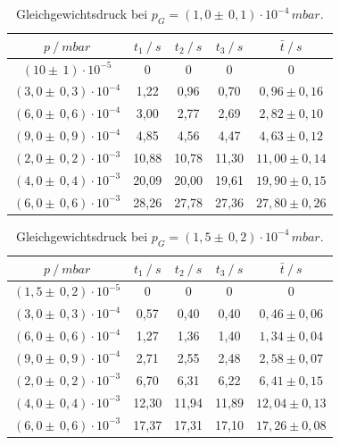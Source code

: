 \begin{table}[H]
\centering
\begin{tabular}{c|c|c|c|c}
	{$p \:/\: \si{mbar}$} & {$t_1 \:/\: \si{s} $} & {$t_2 \:/\: \si{s} $} & {$t_3 \:/\: \si{s} $} & {$\bar{t} \:/\: \si{s}$}\\
\midrule
$(10 \pm \, 1)\cdot 10^{-5}$ &0 &0 &0 &0\\
$(3,0 \pm \, 0,3)\cdot 10^{-4}$ &   1,22 &  0,96 &  0,70 & $0,96 \pm 0,16$\\
$(6,0 \pm \, 0,6)\cdot 10^{-4}$ &   3,00  &  2,77 &  2,69 & $2,82 \pm 0,10 $\\
$(9,0 \pm \, 0,9)\cdot 10^{-4}$ &   4,85 &  4,56 &  4,47 & $4,63 \pm 0,12 $\\
$(2,0 \pm \, 0,2)\cdot 10^{-3}$ &   10,88 &  10,78 &  11,30 & $11,00 \pm 0,14 $\\
$(4,0 \pm \, 0,4)\cdot 10^{-3}$ &   20,09 &  20,00 &  19,61 & $19,90 \pm 0,15 $\\
$(6,0 \pm \, 0,6)\cdot 10^{-3}$ &  28,26 & 27,78 & 27,36 & $27,80 \pm 0,26 $\\
\end{tabular}
\caption{Gleichgewichtsdruck bei $p_G=(1,0 \pm \, 0,1)\cdot 10^{-4} \, \si{mbar}$.}
\label{tab:leck_Turbo2}
\end{table}

\begin{table}[H]
\centering
\begin{tabular}{c|c|c|c|c}
	{$p \:/\: \si{mbar}$} & {$t_1 \:/\: \si{s} $} & {$t_2 \:/\: \si{s} $} & {$t_3 \:/\: \si{s} $} & {$\bar{t} \:/\: \si{s}$}\\
\midrule
$(1,5 \pm \, 0,2)\cdot 10^{-5}$ &0 &0 &0 &0\\
$(3,0 \pm \, 0,3)\cdot 10^{-4}$ &   0,57 &  0,40 &  0,40 & $0,46 \pm 0,06$\\
$(6,0 \pm \, 0,6)\cdot 10^{-4}$ &   1,27  &  1,36 &  1,40 & $1,34 \pm 0,04$\\
$(9,0 \pm \, 0,9)\cdot 10^{-4}$ &   2,71 &  2,55 &  2,48 & $2,58 \pm 0,07$\\
$(2,0 \pm \, 0,2)\cdot 10^{-3}$ &   6,70 &  6,31 &  6,22 & $6,41 \pm 0,15$\\
$(4,0 \pm \, 0,4)\cdot 10^{-3}$ &   12,30 &  11,94 &  11,89 & $12,04 \pm 0,13$\\
$(6,0 \pm \, 0,6)\cdot 10^{-3}$ &  17,37 & 17,31 & 17,10 & $17,26 \pm 0,08$\\
\end{tabular}
\caption{Gleichgewichtsdruck bei $p_G=(1,5 \pm \, 0,2)\cdot 10^{-4} \, \si{mbar}$.}
\label{tab:leck_Turbo3}
\end{table}

